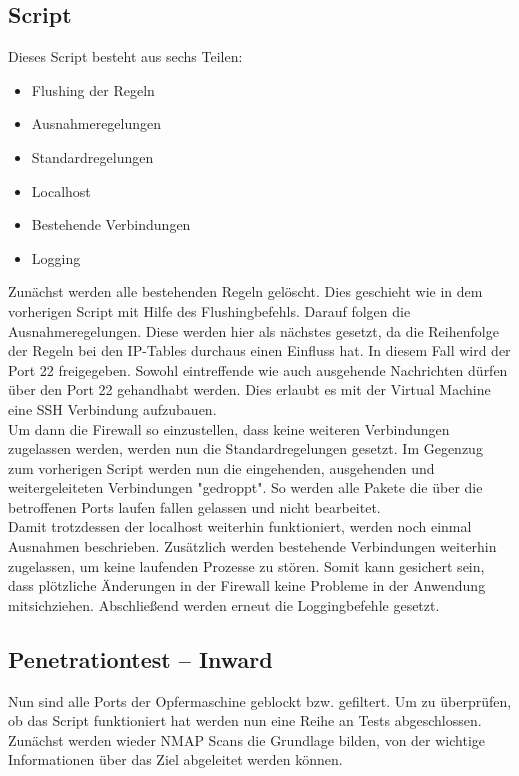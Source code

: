 \subsection{Script}
Dieses Script besteht aus sechs Teilen: 
\begin{itemize}
	\item Flushing der Regeln
	\item Ausnahmeregelungen
	\item Standardregelungen
	\item Localhost
	\item Bestehende Verbindungen
	\item Logging
\end{itemize}
Zunächst werden alle bestehenden Regeln gelöscht. Dies geschieht wie in dem vorherigen Script mit Hilfe des Flushingbefehls. Darauf folgen die Ausnahmeregelungen. Diese werden hier als nächstes gesetzt, da die Reihenfolge der Regeln bei den IP-Tables durchaus einen Einfluss hat. In diesem Fall wird der Port 22 freigegeben. Sowohl eintreffende wie auch ausgehende Nachrichten dürfen über den Port 22 gehandhabt werden. Dies erlaubt es mit der Virtual Machine eine SSH Verbindung aufzubauen. \\
Um dann die Firewall so einzustellen, dass keine weiteren Verbindungen zugelassen werden, werden nun die Standardregelungen gesetzt. Im Gegenzug zum vorherigen Script werden nun die eingehenden, ausgehenden und weitergeleiteten Verbindungen "gedroppt". So werden alle Pakete die über die betroffenen Ports laufen fallen gelassen und nicht bearbeitet. \\
Damit trotzdessen der localhost weiterhin funktioniert, werden noch einmal Ausnahmen beschrieben.
Zusätzlich werden bestehende Verbindungen weiterhin zugelassen, um keine laufenden Prozesse zu stören. Somit kann gesichert sein, dass plötzliche Änderungen in der Firewall keine Probleme in der Anwendung mitsichziehen. 
Abschließend werden erneut die Loggingbefehle gesetzt.

\newpage



\newpage



\subsection{Penetrationtest – Inward}
Nun sind alle Ports der Opfermaschine geblockt bzw. gefiltert. Um zu überprüfen, ob das Script funktioniert hat werden nun eine Reihe an Tests abgeschlossen. Zunächst werden wieder NMAP Scans die Grundlage bilden, von der wichtige Informationen über das Ziel abgeleitet werden können.

